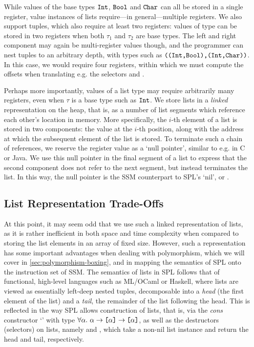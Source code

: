 While values of the base types $\texttt{Int}$, $\texttt{Bool}$ and $\texttt{Char}$ can all be
stored in a single register, value instances of lists
require---in general---multiple registers.
We also support tuples, which also require at least two registers:
values of type  can be stored in two registers
when both $\tau_1$ and $\tau_2$ are base types.
The left and right component may again be multi-register values though, and
the programmer can nest tuples to an arbitrary depth, with types such as
$\texttt{(}\texttt{(}\texttt{Int}\texttt{,}\texttt{Bool}\texttt{)}\texttt{,}\texttt{(}\texttt{Int}\texttt{,}\texttt{Char}\texttt{)}\texttt{)}$. In this case, we would
require four registers, within which we must compute the offsets when
translating e.g. the selectors  and .

Perhaps more importantly, values of a list type \code{[$\tau$]} may require
arbitrarily many registers, even when $\tau$ is a base type such as $\texttt{Int}$.
We store lists in a \emph{linked} representation on the heap, that is, as a
number of list segments which reference each other's location in memory.
More specifically, the $i$-th element of a list is stored in two components: the
value at the $i$-th position, along with the address at which the subsequent
element of the list is stored.
To terminate such a chain of references, we reserve the register value
 as a `null pointer', similar to e.g.  in C or Java.
We use this null pointer in the final segment of a list to express that the
second component does not refer to the next segment, but instead terminates the
list. In this way, the null pointer is the SSM counterpart to SPL's `nil', or
\spl{[]}.

\subsection{List Representation Trade-Offs}
At this point, it may seem odd that we use such a linked representation of
lists, as it is rather inefficient in both space and time complexity when
compared to storing the list elements in an array of fixed size.
However, such a representation has some important advantages when dealing with
polymorphism, which we will cover in \cref{sec:polymorphism-boxing}, and in
mapping the semantics of SPL onto the instruction set of SSM.
The semantics of lists in SPL follows that of functional, high-level languages
such as ML/OCaml or Haskell, where lists are viewed as essentially left-deep
nested tuples, decomposable into a \emph{head} (the first element of the list)
and a \emph{tail}, the remainder of the list following the head. This is
reflected in the way SPL allows construction of lists, that is, via the
\emph{cons} constructor `\spl{:}' with type
$\forall \alpha.\ \alpha \to \texttt{[}\alpha\texttt{]} \to \texttt{[}\alpha\texttt{]}$, as well as the
destructors (selectors) on lists, namely  and , which take a
non-nil list instance and return the head and tail, respectively.

